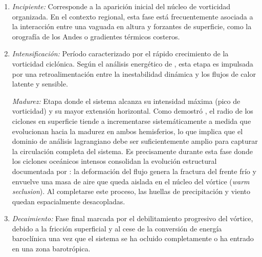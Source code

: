 \begin{enumerate}
    \item \textit{Incipiente:} Corresponde a la aparición inicial del núcleo de vorticidad organizada. En el contexto regional, esta fase está frecuentemente asociada a la interacción entre una vaguada en altura y forzantes de superficie, como la orografía de los Andes o gradientes térmicos costeros.

    \item \textit{Intensificación:} Período caracterizado por el rápido crecimiento de la vorticidad ciclónica. Según el análisis energético de \citet{coutodesouza2024thesis}, esta etapa es impulsada por una retroalimentación entre la inestabilidad dinámica y los flujos de calor latente y sensible.

    
    \textit{Madurez:} Etapa donde el sistema alcanza su intensidad máxima (pico de vorticidad) y su mayor extensión horizontal. Como demostró \citet{simmonds2000size}, el radio de los ciclones en superficie tiende a incrementarse sistemáticamente a medida que evolucionan hacia la madurez en ambos hemisferios, lo que implica que el dominio de análisis lagrangiano debe ser suficientemente amplio para capturar la circulación completa del sistema. Es precisamente durante esta fase donde los ciclones oceánicos intensos consolidan la evolución estructural documentada por \citet{shapiro1999bridge}: la deformación del flujo genera la fractura del frente frío y envuelve una masa de aire que queda aislada en el núcleo del vórtice (\textit{warm seclusion}). Al completarse este proceso, las huellas de precipitación y viento quedan espacialmente desacopladas.

    \item \textit{Decaimiento:} Fase final marcada por el debilitamiento progresivo del vórtice, debido a la fricción superficial y al cese de la conversión de energía baroclínica una vez que el sistema se ha ocluido completamente o ha entrado en una zona barotrópica.
\end{enumerate}


